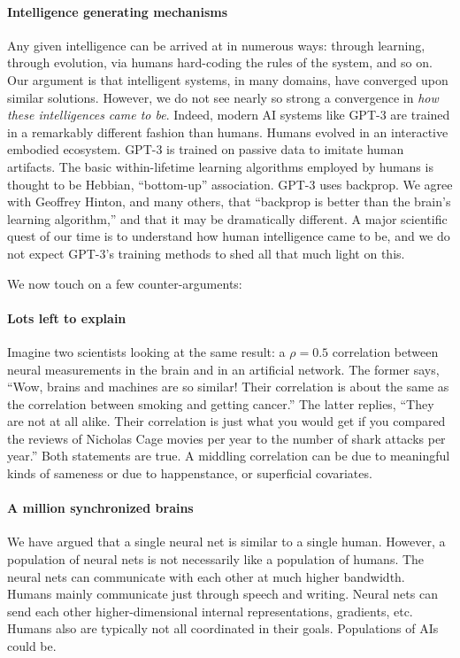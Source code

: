 \documentclass{article}
\theoremstyle{plain}
\theoremstyle{definition}
\theoremstyle{remark}
\begin{document}
\paragraph{Intelligence generating mechanisms} Any given intelligence can be arrived at in numerous ways: through learning, through evolution, via humans hard-coding the rules of the system, and so on. Our argument is that intelligent systems, in many domains, have converged upon similar solutions. However, we do not see nearly so strong a convergence in \textit{how these intelligences came to be}. Indeed, modern AI systems like GPT-3 are trained in a remarkably different fashion than humans. Humans evolved in an interactive embodied ecosystem. GPT-3 is trained on passive data to imitate human artifacts. The basic within-lifetime learning algorithms employed by humans is thought to be Hebbian, ``bottom-up'' association. GPT-3 uses backprop. We agree with Geoffrey Hinton, and many others, that ``backprop is better than the brain's learning algorithm,'' and that it may be dramatically different. A major scientific quest of our time is to understand how human intelligence came to be, and we do not expect GPT-3's training methods to shed all that much light on this.

We now touch on a few counter-arguments:
\paragraph{Lots left to explain} Imagine two scientists looking at the same result: a $\rho = 0.5$ correlation between neural measurements in the brain and in an artificial network. The former says, ``Wow, brains and machines are so similar! Their correlation is about the same as the correlation between smoking and getting cancer.'' The latter replies, ``They are not at all alike. Their correlation is just what you would get if you compared the reviews of Nicholas Cage movies per year to the number of shark attacks per year.'' Both statements are true. A middling correlation can be due to meaningful kinds of sameness or due to happenstance, or superficial covariates. 

\paragraph{A million synchronized brains} We have argued that a single neural net is similar to a single human. However, a population of neural nets is not necessarily like a population of humans. The neural nets can communicate with each other at much higher bandwidth. Humans mainly communicate just through speech and writing. Neural nets can send each other higher-dimensional internal representations, gradients, etc. Humans also are typically not all coordinated in their goals. Populations of AIs could be.
\end{document}
